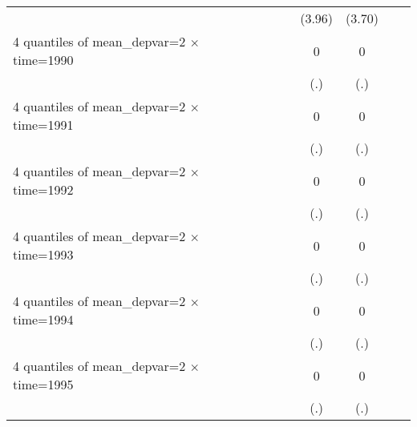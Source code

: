 \begin{table}[htbp]
\begin{tabular}{l*{6}{c}}
                    &                     &                     &      (3.96)         &      (3.70)         &                     &                     \\
[1em]
4 quantiles of mean\_depvar=2 $\times$ time=1990&                     &                     &           0         &           0         &                     &                     \\
                    &                     &                     &         (.)         &         (.)         &                     &                     \\
[1em]
4 quantiles of mean\_depvar=2 $\times$ time=1991&                     &                     &           0         &           0         &                     &                     \\
                    &                     &                     &         (.)         &         (.)         &                     &                     \\
[1em]
4 quantiles of mean\_depvar=2 $\times$ time=1992&                     &                     &           0         &           0         &                     &                     \\
                    &                     &                     &         (.)         &         (.)         &                     &                     \\
[1em]
4 quantiles of mean\_depvar=2 $\times$ time=1993&                     &                     &           0         &           0         &                     &                     \\
                    &                     &                     &         (.)         &         (.)         &                     &                     \\
[1em]
4 quantiles of mean\_depvar=2 $\times$ time=1994&                     &                     &           0         &           0         &                     &                     \\
                    &                     &                     &         (.)         &         (.)         &                     &                     \\
[1em]
4 quantiles of mean\_depvar=2 $\times$ time=1995&                     &                     &           0         &           0         &                     &                     \\
                    &                     &                     &         (.)         &         (.)         &                     &                     \\

\end{tabular}
\end{table}

